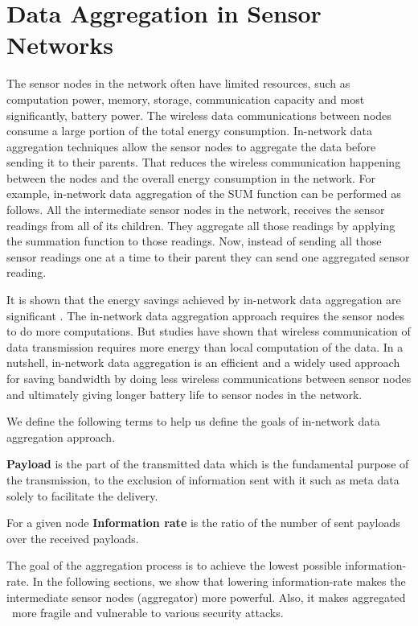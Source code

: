 \section{Data Aggregation in Sensor Networks}

	The sensor nodes in the network often have limited resources, such as computation power, memory, storage, communication capacity and most significantly, battery power.
	The wireless data communications between nodes consume a large portion of the total energy consumption. 
	In-network data aggregation techniques allow the sensor nodes to aggregate the data before sending it to their parents.
	That reduces the wireless communication happening between the nodes and the overall energy consumption in the network. 	
	For example, in-network data aggregation of the SUM function can be performed as follows.
	All the intermediate sensor nodes in the network, receives the sensor readings from all of its children.
	They aggregate all those readings by applying the summation function to those readings.
	Now, instead of sending all those sensor readings one at a time to their parent they can send one aggregated sensor reading.

	It is shown that the energy savings achieved by in-network data aggregation are significant \cite{madden2002tag}.
	The in-network data aggregation approach requires the sensor nodes to do more computations.
	But studies have shown that wireless communication of data transmission requires more energy than local computation of the data. 
	In a nutshell, in-network data aggregation is an efficient and a widely used approach for saving bandwidth by doing less wireless communications between sensor nodes and ultimately giving longer battery life to sensor nodes in the network.

	We define the following terms to help us define the goals of in-network data aggregation approach.
	\begin{definition}\label{def:payload}\cite{PayloadWiKi}
		\textbf{Payload} is the part of the transmitted data which is the fundamental purpose of the transmission, to the exclusion of information sent with it such as meta data solely to facilitate the delivery.
	\end{definition}
	\begin{definition}\label{def:information-rate}
		For a given node \textbf {Information rate} is the ratio of the number of sent payloads over the received payloads.
	\end{definition}
	The goal of the aggregation process is to achieve the lowest possible information-rate.
	In the following sections, we show that lowering information-rate makes the intermediate sensor nodes (aggregator) more powerful.
	Also, it makes aggregated \payload\ more fragile and vulnerable to various security attacks.


